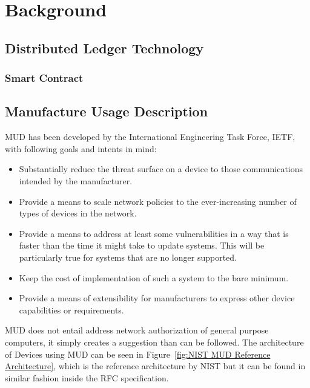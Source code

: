 \chapter{Background}


\section{Distributed Ledger Technology}


\subsection{Smart Contract} %
\label{sec:Smart Contract}



\section{Manufacture Usage Description} %
\label{sec:Manufacture Usage Description}

MUD has been developed by the International Engineering Task Force, IETF, with following goals and intents in mind:
\cite{rfc8520-mud}
\begin{itemize}
	\item Substantially reduce the threat surface on a device to those communications intended by the manufacturer.
	\item Provide a means to scale network policies to the ever-increasing number of types of devices in the network.
	\item Provide a means to address at least some vulnerabilities in a way that is faster than the time it might
	      take to update systems. This will be particularly true for systems that are no longer supported.
	\item Keep the cost of implementation of such a system to the bare minimum.
	\item Provide a means of extensibility for manufacturers to express other device capabilities or requirements.
\end{itemize}

MUD does not entail address network authorization of general purpose computers, it simply creates a suggestion than can
be followed.
The architecture of Devices using MUD can be seen in Figure~\ref{fig:NIST MUD Reference Architecture}, which is the
reference architecture by NIST \cite{dodson2021securing} but it can be found in similar fashion inside the RFC
specification.


